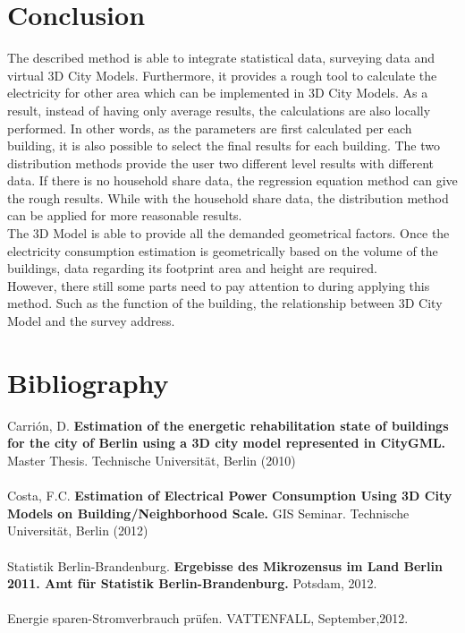 \documentclass[11pt]{article}
\begin{document}
\section{Conclusion}
The described method is able to integrate statistical data, surveying data and virtual 3D City Models. Furthermore, it provides a rough tool to calculate the electricity for other area which can be implemented in 3D City Models. As a result, instead of having only average results, the calculations are also locally performed. In other words, as the parameters are first calculated per each building, it is also possible to select the final results for each building. The two distribution methods provide the user two different level results with different data. If there is no household share data, the regression equation method can give the rough results. While with the household share data, the distribution method can be applied for more reasonable results.\\

The 3D Model is able to provide all the demanded geometrical factors. Once the electricity consumption estimation is geometrically based on the volume of the buildings, data regarding its footprint area and height are required. \\

However, there still some parts need to pay attention to during applying this method. Such as the function of the building, the relationship between 3D City Model and the survey address.

\section{Bibliography}
Carrión, D. \textbf{Estimation of the energetic rehabilitation state of buildings for the city of Berlin using a 3D city model represented in CityGML.}  Master Thesis. Technische Universität, Berlin (2010)\\
\\
Costa, F.C. \textbf{Estimation of Electrical Power Consumption Using 3D City Models on Building/Neighborhood Scale.}  GIS Seminar. Technische Universität, Berlin (2012)\\
\\
Statistik Berlin-Brandenburg. \textbf{Ergebisse des Mikrozensus im Land Berlin 2011. Amt für Statistik Berlin-Brandenburg.}  Potsdam, 2012.\\
\\
Energie sparen-Stromverbrauch prüfen. VATTENFALL, September,2012.
\end{document}
